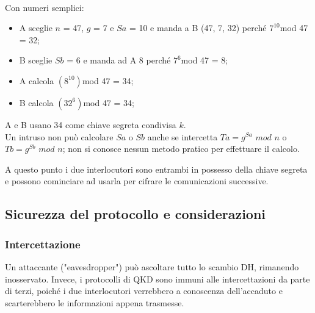 \begin{esempio} \\
    Con numeri semplici:
    \begin{itemize}
        \item A sceglie $n$ = 47, $g$ = 7 e $Sa$ = 10 e manda a B (47, 7, 32) perché $7^{10}$mod 47 = 32;
        \item B sceglie $Sb$ = 6 e manda ad A 8 perché $7^6$mod 47 = 8;
        \item A calcola $(8^{10})$mod 47 = 34;
        \item B calcola $(32^6)$mod 47 = 34;
    \end{itemize}
    A e B usano 34 come chiave segreta condivisa $k$.\\
    Un intruso non può calcolare $Sa$ o $Sb$ anche se intercetta $Ta = g^{Sa}$ $mod$ $n$ o $Tb = g^{Sb}$ $mod$ $n$; non si conosce nessun metodo pratico per effettuare il calcolo.
\end{esempio}
A questo punto i due interlocutori sono entrambi in possesso della chiave segreta e possono cominciare ad usarla per cifrare le comunicazioni successive.
\subsection{Sicurezza del protocollo e considerazioni}
\subsubsection{Intercettazione}
Un attaccante ("eavesdropper") può ascoltare tutto lo scambio DH, rimanendo inosservato. Invece, i protocolli di QKD sono immuni alle intercettazioni da parte di terzi, poiché i due interlocutori verrebbero a conoscenza dell'accaduto e scarterebbero le informazioni appena trasmesse.

